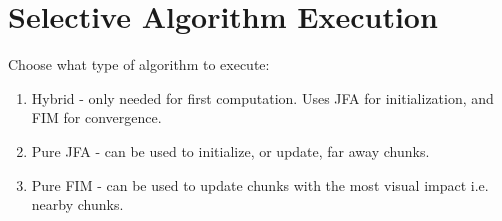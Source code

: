 \begin{table}[h]
    \centering
    \caption{Distance field compute shader execution time using hybrid JFA and FIM approach. Compared against a pure
        FIM execution.}
\end{table}

\section{Selective Algorithm Execution}
Choose what type of algorithm to execute:

\begin{enumerate}
    \item Hybrid - only needed for first computation. Uses JFA for initialization, and FIM for convergence.
    \item Pure JFA - can be used to initialize, or update, far away chunks.
    \item Pure FIM - can be used to update chunks with the most visual impact i.e. nearby chunks.
\end{enumerate}
